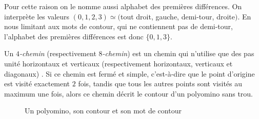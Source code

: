 Pour cette raison on le nomme aussi alphabet des premières différences. On interprète les valeurs $(0,1,2,3)\simeq ($tout droit, gauche, demi-tour, droite$)$. En nous limitant aux mots de contour, qui ne contiennent pas de demi-tour, l'alphabet des premières différences est donc $\{0,1,3\}$.

Un \emph{$4$-chemin} (respectivement \emph{$8$-chemin}) est un chemin qui n'utilise que des pas unité horizontaux et verticaux (respectivement horizontaux, verticaux et diagonaux) . Si ce chemin est fermé et simple, c'est-à-dire que le point d'origine est visité exactement $2$ fois, tandis que tous les autres points sont visités au maximum une fois, alors ce chemin décrit le contour d'un polyomino sans trou.
\begin{figure}[H]
\begin{subfigure}{.33\linewidth}
\centering
{}
\end{subfigure}
\begin{subfigure}{.33\linewidth}
\centering
{}
\end{subfigure}\begin{subfigure}{.33\linewidth}\centering {} \end{subfigure}

\caption{Un polyomino, son contour et son mot de contour}
\end{figure}


